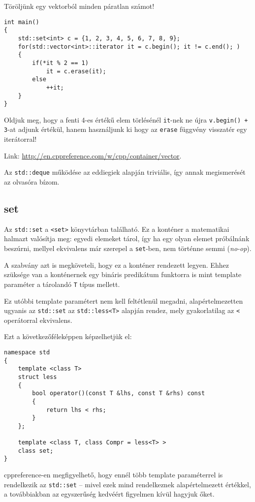 \documentclass[a4paper,11.5pt,table]{article}
\begin{document}
	\smallskip
	Töröljünk egy vektorból minden páratlan számot!
	\begin{lstlisting}
int main()
{
	std::set<int> c = {1, 2, 3, 4, 5, 6, 7, 8, 9};
	for(std::vector<int>::iterator it = c.begin(); it != c.end(); )
	{
		if(*it % 2 == 1)
			it = c.erase(it);
		else
			++it;
	}
}
	\end{lstlisting}
	\begin{note}
		Oldjuk meg, hogy a fenti 4-es értékű elem törlésénél \texttt{it}-nek ne újra \texttt{v.begin() + 3}-at adjunk értékül, hanem használjunk ki hogy az \texttt{erase} függvény visszatér egy iterátorral!
	\end{note}
	Link: \url{http://en.cppreference.com/w/cpp/container/vector}.
	
	\begin{note}
		Az \texttt{std::deque} működése az eddiegiek alapján triviális, így annak megismerését az olvasóra bízom.
	\end{note}
	\subsection{set}
	
	Az \texttt{std::set} a \texttt{<set>} könyvtárban található. Ez a konténer a matematikai halmazt valósítja meg: egyedi elemeket tárol, így ha egy olyan elemet próbálnánk beszúrni, mellyel ekvivalens már szerepel a \texttt{set}-ben, nem történne semmi (\textit{no-op}). 
	
	A szabvány azt is megköveteli, hogy ez a konténer rendezett legyen. Ehhez szüksége van a konténernek egy bináris predikátum funktorra is mint template paraméter a tárolandó \texttt{T} típus mellett.
	\smallskip
	
	Ez utóbbi template paramétert nem kell feltétlenül megadni, alapértelmezetten ugyanis az \texttt{std::set} az \texttt{std::less<T>} alapján rendez, mely gyakorlatilag az \texttt{<} operátorral ekvivalens.
	\smallskip
	
	Ezt a következőféleképpen képzelhetjük el:
	\begin{lstlisting}
namespace std
{
	template <class T>
	struct less
	{
		bool operator()(const T &lhs, const T &rhs) const
		{
			return lhs < rhs;
		}
	};

	template <class T, class Compr = less<T> >
	class set;
}
	\end{lstlisting}
	\begin{note}
		cppreference-en megfigyelhető, hogy ennél több template paraméterrel is rendelkezik az \texttt{std::set} -- mivel ezek mind rendelkeznek alapértelmezett értékkel, a továbbiakban az egyszerűség kedvéért figyelmen kívül hagyjuk őket.
	\end{note}
	
\end{document}
